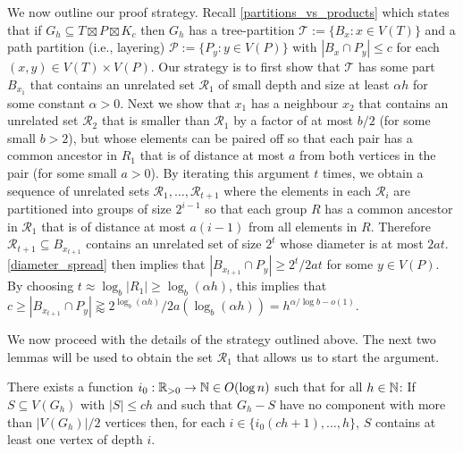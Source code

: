 \documentclass{patmorin}
\renewcommand{\le}{\leqslant}
\renewcommand{\ge}{\geqslant}
\begin{document}

We now outline our proof strategy.  Recall \cref{partitions_vs_products} which states that if $G_h\subseteq T\boxtimes P\boxtimes K_c$ then $G_h$ has a tree-partition $\mathcal{T}:=\{B_x:x\in V(T)\}$ and a path partition (i.e., layering) $\mathcal{P}:=\{P_y:y\in V(P)\}$ with $|B_x\cap P_y|\le c$ for each $(x,y)\in V(T)\times V(P)$. Our strategy is to first show that $\mathcal{T}$ has some part $B_{x_1}$ that contains an unrelated set $\mathcal{R}_1$ of small depth and size at least $\alpha h$ for some constant $\alpha >0$.  Next we show that $x_1$ has a neighbour $x_2$ that contains an unrelated set $\mathcal{R}_2$ that is smaller than $\mathcal{R}_1$ by a factor of at most $b/2$ (for some small $b>2$), but whose elements can be paired off so that each pair has a common ancestor in $R_1$ that is of distance at most $a$ from both vertices in the pair (for some small $a>0$).  By iterating this argument $t$ times, we obtain a sequence of unrelated sets $\mathcal{R}_1,\ldots,\mathcal{R}_{t+1}$ where the elements in each $\mathcal{R}_i$ are partitioned into groups of size $2^{i-1}$ so that each group $R$ has a common ancestor in $\mathcal{R}_1$ that is of distance at most $a(i-1)$ from all elements in $R$.  Therefore $\mathcal{R}_{t+1}\subseteq B_{x_{t+1}}$ contains an unrelated set of size $2^{t}$ whose diameter is at most $2at$.  \cref{diameter_spread} then implies that $|B_{x_{t+1}}\cap P_y|\ge 2^{t}/2at$ for some $y\in V(P)$.  By choosing  $t\approx\log_b |R_1|\ge \log_{b}(\alpha h)$, this implies that $c\ge |B_{x_{t+1}}\cap P_y|\gtrapprox 2^{\log_{b}(\alpha h)}/2a(\log_{b}(\alpha h))=h^{\alpha/\log b-o(1)}$.

We now proceed with the details of the strategy outlined above.  The next two lemmas will be used to obtain the set $\mathcal{R}_1$ that allows us to start the argument.

\begin{lem}\label{small_depth_separator}
  There exists a function $i_0:\mathbb{R}_{>0}\to\mathbb{N}\in O(\log n)$ such that for all $h\in\mathbb{N}$: If $S\subseteq V(G_h)$ with $|S|\le ch$ and such that $G_h-S$ have no component with more than $|V(G_h)|/2$ vertices then, for each $i\in\{i_0(ch+1),\ldots,h\}$, $S$ contains at least one vertex of depth $i$.
\end{lem}
\end{document}
